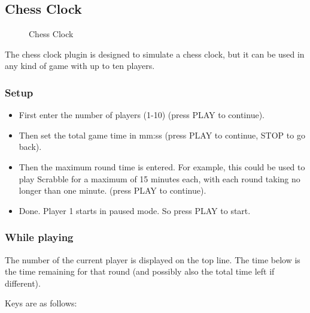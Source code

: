 \subsection{Chess Clock}
\begin{figure}[h]
\begin{center}
\end{center}
\caption{Chess Clock}
\end{figure}

The chess clock plugin is designed  to
simulate a chess clock, but it can be used
in any kind of game with up to ten players.

\subsubsection{Setup}

\begin{itemize}
\item First enter the number of players (1{}-10) (press  PLAY to
continue). 
\item Then set the total game time in mm:ss (press PLAY to continue,
STOP to go back). 
\item Then the maximum round time is entered.  For example, this could
be used  to play Scrabble for a maximum of 15 minutes each, with each
round taking no longer than one minute. (press  PLAY to continue). 
\item Done. Player 1 starts in paused mode. So press PLAY to start.
\end{itemize}

\subsubsection{While playing}
The number of the current player is displayed on the top line. The time
below is the time remaining for that round (and possibly also the total
time left if different). 

Keys are as follows:

